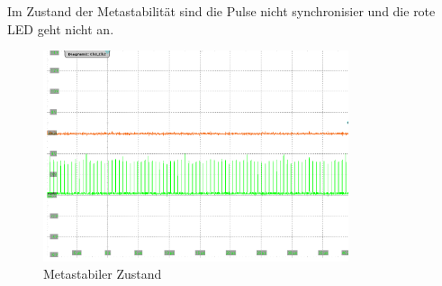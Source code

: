 \newpage
Im Zustand der Metastabilität sind die Pulse nicht synchronisier und die rote LED geht nicht an.

\begin{figure}[H]
	\includegraphics[width=0.8\textwidth]{images/metastability/asynchron_en_.png}
	\caption{Metastabiler Zustand}
	\label{fig.metastabil.Metastabil}
\end{figure}

